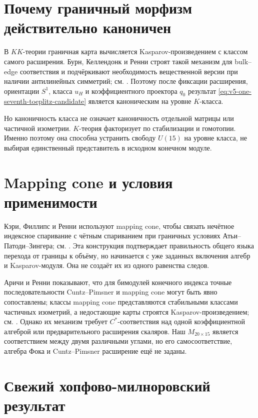 \section{Почему граничный морфизм действительно каноничен}

В $KK$-теории граничная карта вычисляется Kasparov-произведением с
классом самого расширения. Бурн, Келлендонк и Ренни строят такой механизм
для bulk--edge соответствия и подчёркивают необходимость вещественной
версии при наличии антилинейных симметрий; см.
. Поэтому после фиксации расширения, ориентации
$S^1$, класса $u_H$ и коэффициентного проектора $q_0$ результат
\eqref{eq:v5-one-seventh-toeplitz-candidate} является каноническим на
уровне $K$-класса.

Но каноничность класса не означает каноничность отдельной матрицы или
частичной изометрии. $K$-теория факторизует по стабилизации и гомотопии.
Именно поэтому она способна устранить свободу $U(15)$ на уровне класса,
не выбирая единственный представитель в исходном конечном модуле.

\section{Mapping cone и условия применимости}

Кэри, Филлипс и Ренни используют mapping cone, чтобы связать нечётное
индексное спаривание с чётным спариванием при граничных условиях
Атьи--Патоди--Зингера; см. . Эта конструкция
подтверждает правильность общего языка перехода от границы к объёму, но
начинается с уже заданных включения алгебр и Kasparov-модуля. Она не
создаёт их из одного равенства следов.

Аричи и Ренни показывают, что для бимодулей конечного индекса точные
последовательности Cuntz--Pimsner и mapping cone могут быть явно
сопоставлены; классы mapping cone представляются стабильными классами
частичных изометрий, а недостающие карты строятся Kasparov-произведением;
см. . Однако их механизм требует
$C^*$-соответствия над одной коэффициентной алгеброй или предварительного
расширения скаляров. Наш $M_{20\times15}$ является соответствием между
двумя различными углами, но его самосоответствие, алгебра Фока и
Cuntz--Pimsner расширение ещё не заданы.

\section{Свежий хопфово-милноровский результат}


